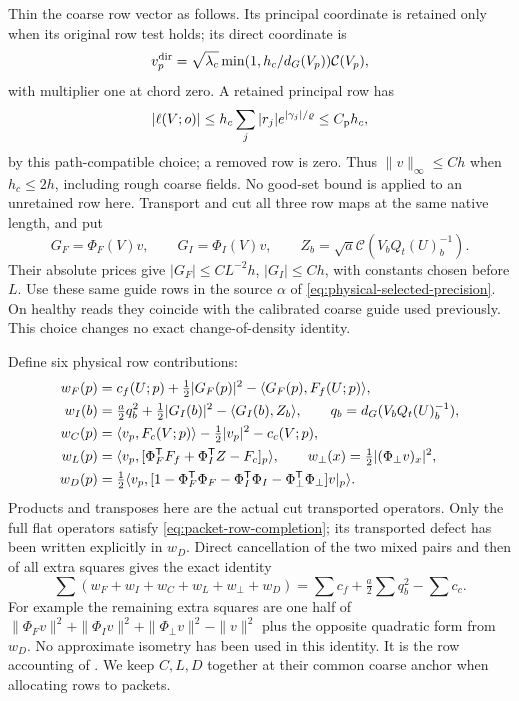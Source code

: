 \documentclass[11pt,reqno]{amsart}
\numberwithin{equation}{section}
\theoremstyle{definition}
\theoremstyle{remark}
\begin{document}
Thin the coarse row vector as follows. Its principal coordinate
is retained only when its original row test holds; its direct
coordinate is
\[
       v_p^{\rm dir}=\sqrt{\lambda_c}
                    \min(1,h_c/d_G(V_p))\mathcal C(V_p),
\]
with multiplier one at chord zero. A retained principal row has
\[
 |\ell(V;o)|\le h_c\sum_j|r_j|e^{|\gamma_j|/\varrho}
                                                     \le C_{\rm p}h_c,
\]
by this path-compatible choice; a removed row is zero.
Thus \(\|v\|_\infty\le Ch\) when \(h_c\le2h\), including
rough coarse fields. No good-set bound is applied to an
unretained row here.
Transport and cut all three row maps at the same native length,
and put
\[
 G_F=\Phi_F(V)v,\qquad G_I=\Phi_I(V)v,\qquad
                         Z_b=\sqrt a\mathcal C(V_bQ_t(U)_b^{-1}).
\]
Their absolute prices give \(|G_F|\le CL^{-2}h\),
\(|G_I|\le Ch\), with constants chosen before \(L\).
Use these same guide rows in the source \(\alpha\) of
\eqref{eq:physical-selected-precision}. On healthy reads they
coincide with the calibrated coarse guide used previously.
This choice changes no exact change-of-density identity.

Define six physical row contributions:
\begin{align}
 w_F(p)&=c_f(U;p)+\tfrac12|G_F(p)|^2-\langle G_F(p),F_f(U;p)\rangle,
                                                        \notag\\
 w_I(b)&=\tfrac a2q_b^2+\tfrac12|G_I(b)|^2-\langle G_I(b),Z_b\rangle,
       \qquad q_b=d_G(V_bQ_t(U)_b^{-1}),\notag\\
 w_C(p)&=\langle v_p,F_c(V;p)\rangle-\tfrac12|v_p|^2-c_c(V;p),\notag\\
 w_L(p)&=\langle v_p,[\Phi_F^{\mathsf T}F_f+\Phi_I^{\mathsf T}Z-F_c]_p\rangle,
       \qquad w_\perp(x)=\tfrac12|(\Phi_\perp v)_x|^2,\notag\\
 w_D(p)&=\tfrac12\langle v_p,
       [1-\Phi_F^{\mathsf T}\Phi_F-\Phi_I^{\mathsf T}\Phi_I-\Phi_\perp^{\mathsf T}\Phi_\perp]v|_p\rangle.
 \label{eq:packet-physical-rows}
\end{align}
Products and transposes here are the actual cut transported
operators. Only the full flat operators satisfy
\eqref{eq:packet-row-completion}; its transported defect has
been written explicitly in \(w_D\).
Direct cancellation of the two mixed pairs and then of all
extra squares gives the exact identity
\begin{equation}
 \sum(w_F+w_I+w_C+w_L+w_\perp+w_D)
                      =\sum c_f+\tfrac a2\sum q_b^2-\sum c_c.
 \label{eq:packet-exact-row-identity}
\end{equation}
For example the remaining extra squares are one half of
\(\|\Phi_Fv\|^2+\|\Phi_Iv\|^2+\|\Phi_\perp v\|^2-\|v\|^2\)
plus the opposite quadratic form from \(w_D\).
No approximate isometry has been used in this identity.
It is the row accounting of
\cite[Lemma~30.5, p.~172]{Main}. We keep \(C,L,D\) together
at their common coarse anchor when allocating rows to packets.
\end{document}
